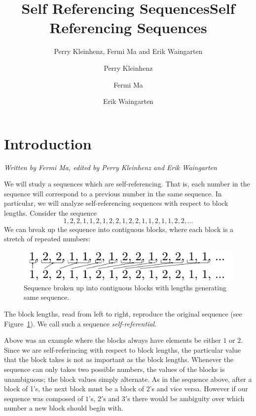 \documentclass[runningheads,a4paper]{llncs}
\title{Self Referencing Sequences}
\author{Perry Kleinhenz, Fermi Ma and Erik Waingarten}
\date{}							%
\begin{document}
\title{Self Referencing Sequences}

\author{Perry Kleinhenz \and Fermi Ma \and Erik Waingarten}
%


\maketitle

\section{Introduction}

\emph{Written by Fermi Ma, edited by Perry Kleinhenz and Erik Waingarten}

We will study a sequences which are self-referencing. That is, each number in the sequence will correspond to a previous number in the same sequence. In particular, we will analyze self-referencing sequences with respect to block lengths. Consider the sequence
\begin{equation}
\label{eq:onetwo}
1,2,2,1,1,2,1,2,2,1,2,2,1,1,2,1,1,2,2,\dots
\end{equation}
We can break up the sequence into contiguous blocks, where each block is a stretch of repeated numbers:
\begin{figure}
\label{fig:sequenceblocks}
\center
\includegraphics[width=0.4\linewidth]{sequenceBlocks}
\caption{Sequence broken up into contiguous blocks with lengths generating same sequence.}
\end{figure}

The block lengths, read from left to right, reproduce the original sequence (see Figure~\ref{fig:sequenceblocks}). We call such a sequence \emph{self-referential}. 

Above was an example where the blocks always have elements be either $1$ or $2$. Since we are self-referincing with respect to block lengths, the particular value that the block takes is not as important as the block lengths. Whenever the sequence can only takes two possible numbers, the values of the blocks is unambiguous; the block values simply alternate. As in the sequence above, after a block of 1's, the next block must be a block of 2's and vice versa. However if our sequence was composed of $1$'s, $2'$s and $3'$s there would be ambiguity over which number a new block should begin with. 
\end{document}
